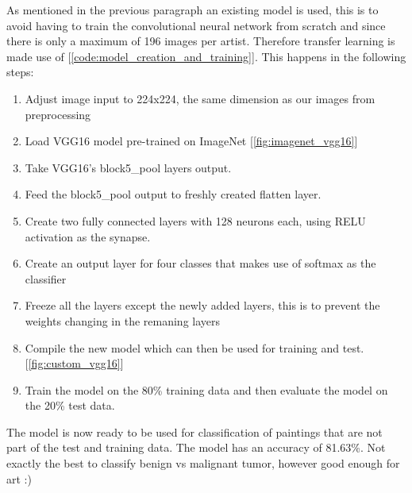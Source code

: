  As mentioned in the previous paragraph an existing model is used, this is to avoid having to train the convolutional neural network from scratch and since there is only a maximum of 196 images per artist. Therefore transfer learning is made use of [\ref{code:model_creation_and_training}]. This happens in the following steps:
\begin{enumerate}
    \item Adjust image input to 224x224, the same dimension as our images from preprocessing
    \item Load VGG16 model pre-trained on ImageNet [\ref{fig:imagenet_vgg16}]
    \item Take VGG16's block5\_pool layers output.
    \item Feed the block5\_pool output to freshly created flatten layer.
    \item Create two fully connected layers with 128 neurons each, using RELU activation as the synapse.
    \item Create an output layer for four classes that makes use of softmax as the classifier
    \item Freeze all the layers except the newly added layers, this is to prevent the weights changing in the remaning layers
    \item Compile the new model which can then be used for training and test. [\ref{fig:custom_vgg16}]
    \item Train the model on the 80\% training data and then evaluate the model on the 20\% test data.
\end{enumerate}

The model is now ready to be used for classification of paintings that are not part of the test and training data. The model has an accuracy of 81.63\%. Not exactly the best to classify benign vs malignant tumor, however good enough for art :)




